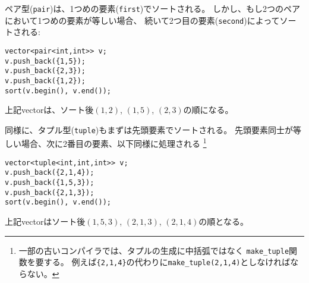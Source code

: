 \begin{comment}

Pairs (\texttt{pair}) are sorted primarily according to their
first elements (\texttt{first}).
However, if the first elements of two pairs are equal,
they are sorted according to their second elements (\texttt{second}):
\begin{lstlisting}
vector<pair<int,int>> v;
v.push_back({1,5});
v.push_back({2,3});
v.push_back({1,2});
sort(v.begin(), v.end());
\end{lstlisting}
After this, the order of the pairs is
$(1,2)$, $(1,5)$ and $(2,3)$.
\end{comment}


ペア型(\texttt{pair})は、1つめの要素(\texttt{first})でソートされる。
しかし、もし2つのペアにおいて1つめの要素が等しい場合、
続いて2つ目の要素(\texttt{second})によってソートされる:
\begin{lstlisting}
vector<pair<int,int>> v;
v.push_back({1,5});
v.push_back({2,3});
v.push_back({1,2});
sort(v.begin(), v.end());
\end{lstlisting}
上記vectorは、ソート後$(1,2)$, $(1,5)$, $(2,3)$の順になる。



\begin{comment}
In a similar way, tuples (\texttt{tuple})
are sorted primarily by the first element,
secondarily by the second element, etc.\footnote{Note that in some older compilers,
the function \texttt{make\_tuple} has to be used to create a tuple instead of
braces (for example, \texttt{make\_tuple(2,1,4)} instead of \texttt{\{2,1,4\}}).}:
\begin{lstlisting}
vector<tuple<int,int,int>> v;
v.push_back({2,1,4});
v.push_back({1,5,3});
v.push_back({2,1,3});
sort(v.begin(), v.end());
\end{lstlisting}
After this, the order of the tuples is
$(1,5,3)$, $(2,1,3)$ and $(2,1,4)$.
\end{comment}

同様に、タプル型(\texttt{tuple})もまずは先頭要素でソートされる。
先頭要素同士が等しい場合、次に2番目の要素、以下同様に処理される
\footnote{一部の古いコンパイラでは、タプルの生成に中括弧ではなく
\texttt{make\_tuple}関数を要する。
例えば\texttt{\{2,1,4\}}の代わりに\texttt{make\_tuple(2,1,4)}としなければならない。}
\begin{lstlisting}
vector<tuple<int,int,int>> v;
v.push_back({2,1,4});
v.push_back({1,5,3});
v.push_back({2,1,3});
sort(v.begin(), v.end());
\end{lstlisting}
上記vectorはソート後$(1,5,3)$, $(2,1,3)$, $(2,1,4)$の順となる。

